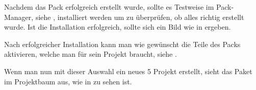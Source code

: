 

\label{sec:cmsis-installation}

Nachdem das Pack erfolgreich erstellt wurde, sollte es Testweise im Pack-Manager, siehe , installiert werden um zu überprüfen, ob alles richtig erstellt wurde. Ist die Installation erfolgreich, sollte sich ein Bild wie in  ergeben.


Nach erfolgreicher Installation kann man wie gewünscht die Teile des Packs aktivieren, welche man für sein Projekt braucht, siehe .


Wenn man nun mit dieser Auswahl ein neues \uVision{} 5 Projekt erstellt, sieht das Paket im Projektbaum aus, wie in  zu sehen ist.

